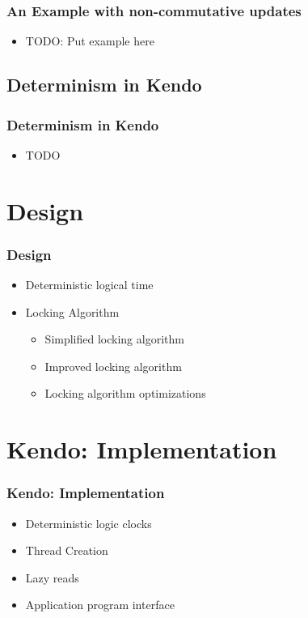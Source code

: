 \documentclass{beamer}
\begin{document}
\begin{frame}
\frametitle{An Example with non-commutative updates}
\begin{itemize}
\item TODO: Put example here
\end{itemize}
\end{frame}

\subsection{Determinism in Kendo}
\begin{frame}
\frametitle{Determinism in Kendo}
\begin{itemize}
\item TODO
\end{itemize}
\end{frame}

\section{Design}
\begin{frame}
\frametitle{Design}
\begin{itemize}
\item Deterministic logical time
\item Locking Algorithm
\begin{itemize}
  \item Simplified locking algorithm
  \item Improved locking algorithm
  \item Locking algorithm optimizations
\end{itemize}
\end{itemize}
\end{frame}

\section{Kendo: Implementation}
\begin{frame}
\frametitle{Kendo: Implementation}
\begin{itemize}
\item Deterministic logic clocks
\item Thread Creation
\item Lazy reads
\item Application program interface
\end{itemize}
\end{frame}
\end{document}
